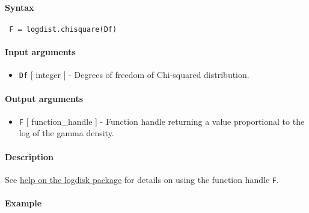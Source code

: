 


	\paragraph{Syntax}
 
 \begin{verbatim}
 F = logdist.chisquare(Df)
 \end{verbatim}
 
 \paragraph{Input arguments}
 
 \begin{itemize}
 \item
   \texttt{Df} {[} integer {]} - Degrees of freedom of Chi-squared
   distribution.
 \end{itemize}
 
 \paragraph{Output arguments}
 
 \begin{itemize}
 \item
   \texttt{F} {[} function\_handle {]} - Function handle returning a
   value proportional to the log of the gamma density.
 \end{itemize}
 
 \paragraph{Description}
 
 See \href{logdist/Contents}{help on the logdisk package} for details on
 using the function handle \texttt{F}.
 
 \paragraph{Example}


